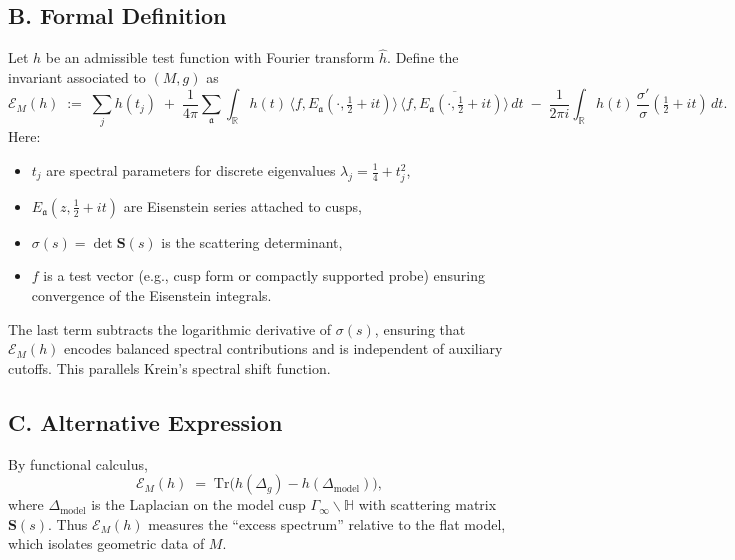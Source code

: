 \subsection*{B. Formal Definition}
\label{subsec:invariant-definition}

\begin{definition}
Let $h$ be an admissible test function with Fourier transform $\hat h$.
Define the invariant associated to $(M,g)$ as
\[
   \mathcal{E}_M(h)
   \;:=\;
   \sum_j h(t_j)
   \;+\;
   \frac{1}{4\pi}\sum_{\mathfrak a}\int_{\mathbb{R}} h(t)\,
     \langle f, E_{\mathfrak a}(\cdot,\tfrac12+it)\rangle\,
     \overline{\langle f, E_{\mathfrak a}(\cdot,\tfrac12+it)\rangle}\,dt
   \;-\;
   \frac{1}{2\pi i}\int_{\mathbb{R}} h(t)\,\frac{\sigma'}{\sigma}\!\left(\tfrac12+it\right)\,dt.
\]
Here:
\begin{itemize}
  \item $t_j$ are spectral parameters for discrete eigenvalues $\lambda_j=\tfrac14+t_j^2$,
  \item $E_{\mathfrak a}(z,\tfrac12+it)$ are Eisenstein series attached to cusps,
  \item $\sigma(s)=\det \mathbf S(s)$ is the scattering determinant,
  \item $f$ is a test vector (e.g., cusp form or compactly supported probe) ensuring
        convergence of the Eisenstein integrals.
\end{itemize}
\end{definition}

\begin{remark}
The last term subtracts the logarithmic derivative of $\sigma(s)$,
ensuring that $\mathcal{E}_M(h)$ encodes balanced spectral contributions
and is independent of auxiliary cutoffs. This parallels Krein’s spectral shift function.
\end{remark}

\subsection*{C. Alternative Expression}
\label{subsec:invariant-alternative}

By functional calculus,
\[
   \mathcal{E}_M(h) \;=\; \mathrm{Tr}\big( h(\Delta_g) - h(\Delta_{\mathrm{model}})\big),
\]
where $\Delta_{\mathrm{model}}$ is the Laplacian on the model cusp $\Gamma_\infty\backslash\mathbb H$
with scattering matrix $\mathbf S(s)$. Thus $\mathcal{E}_M(h)$ measures the ``excess spectrum''
relative to the flat model, which isolates geometric data of $M$.

